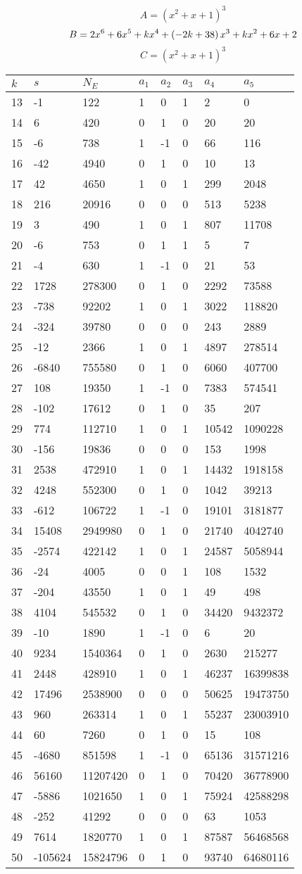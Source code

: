 \documentclass{amsart}
\begin{document}
$$A=(x^2
 + x
 + 1)^{3}$$
$$B=2\*x^6
 + 6\*x^5
 + k\*x^4
 + \left(-2\*k
 + 38\right) \*x^3
 + k\*x^2
 + 6\*x
 + 2$$
$$C=(x^2
 + x
 + 1)^{3}$$
\begin{longtable}{|l|l|l|lllll|}
\hline
$k$ & $s$ & $N_E$ & $a_1$ & $a_2$ & $a_3$ & $a_4$ & $a_5$\\
\hline
13&-1&122&1&0&1&2&0\\
14&6&420&0&1&0&20&20\\
15&-6&738&1&-1&0&66&116\\
16&-42&4940&0&1&0&10&13\\
17&42&4650&1&0&1&299&2048\\
18&216&20916&0&0&0&513&5238\\
19&3&490&1&0&1&807&11708\\
20&-6&753&0&1&1&5&7\\
21&-4&630&1&-1&0&21&53\\
22&1728&278300&0&1&0&2292&73588\\
23&-738&92202&1&0&1&3022&118820\\
24&-324&39780&0&0&0&243&2889\\
25&-12&2366&1&0&1&4897&278514\\
26&-6840&755580&0&1&0&6060&407700\\
27&108&19350&1&-1&0&7383&574541\\
28&-102&17612&0&1&0&35&207\\
29&774&112710&1&0&1&10542&1090228\\
30&-156&19836&0&0&0&153&1998\\
31&2538&472910&1&0&1&14432&1918158\\
32&4248&552300&0&1&0&1042&39213\\
33&-612&106722&1&-1&0&19101&3181877\\
34&15408&2949980&0&1&0&21740&4042740\\
35&-2574&422142&1&0&1&24587&5058944\\
36&-24&4005&0&0&1&108&1532\\
37&-204&43550&1&0&1&49&498\\
38&4104&545532&0&1&0&34420&9432372\\
39&-10&1890&1&-1&0&6&20\\
40&9234&1540364&0&1&0&2630&215277\\
41&2448&428910&1&0&1&46237&16399838\\
42&17496&2538900&0&0&0&50625&19473750\\
43&960&263314&1&0&1&55237&23003910\\
44&60&7260&0&1&0&15&108\\
45&-4680&851598&1&-1&0&65136&31571216\\
46&56160&11207420&0&1&0&70420&36778900\\
47&-5886&1021650&1&0&1&75924&42588298\\
48&-252&41292&0&0&0&63&1053\\
49&7614&1820770&1&0&1&87587&56468568\\
50&-105624&15824796&0&1&0&93740&64680116\\
\hline
\end{longtable}
\end{document}
